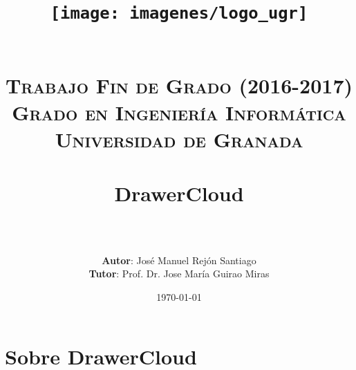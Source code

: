 



\title{	
\begin{figure}[h]
	\centering
	\texttt{[image: imagenes/logo\_ugr]}
\end{figure}
\normalfont \normalsize
\textsc{{ \\ \bf Trabajo Fin de Grado (2016-2017)} \\ Grado en Ingeniería Informática \\ Universidad de Granada} \\ [25pt] %
\horrule{0.5pt} \\[0.4cm] %
\huge DrawerCloud \\ %
\horrule{2pt} \\[0.5cm] %
}

\author{\textbf{Autor}: José Manuel Rejón Santiago \\ \textbf{Tutor}: Prof. Dr. Jose María Guirao Miras} %

\date{\normalsize\today} %





\maketitle %

\newpage %

\tableofcontents %

\listoffigures

\listoftables

\newpage

\section{Sobre DrawerCloud}
